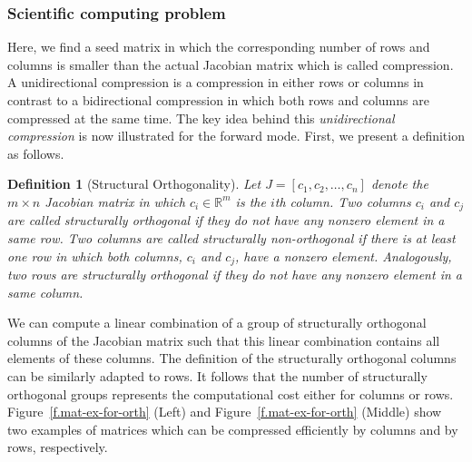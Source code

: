 \documentclass[12pt, twoside,a4paper,toc=bibliography]{scrbook}
\newtheorem{definition}{Definition}
\newcommand{\figref}[1]{Figure~\protect\ref{#1}}
\newcommand{\setR}{\ensuremath{\mathbb{R}}}
\begin{document}
\subsubsection{Scientific computing problem}
\label{ss.problem.full}
Here, we find a seed matrix in which
the corresponding number of rows and columns is smaller than the actual Jacobian matrix which is called compression.
A unidirectional compression is a compression in either rows or columns in contrast to
a bidirectional compression in which both rows and columns are compressed at the same time.
The key idea behind this \emph{unidirectional compression} is now illustrated for the
forward mode. First, we present a definition as follows.
\begin{definition}[Structural Orthogonality]
\label{d:struct_orth}
Let $J=[c_1, c_2, \dots, c_n]$ denote the $m\times n$ Jacobian matrix
in which $c_i \in \setR^m$ is the $i$th
column. Two columns $c_i$ and $c_j$ are
called \emph{structurally orthogonal} if they do not have any nonzero element in a same
row. Two columns are called \emph{structurally non-orthogonal} if there is at least one
row in which both columns, $c_i$ and $c_j$, have a nonzero element.
Analogously, two rows are
\emph{structurally orthogonal} if they do not have any nonzero element in a same column.
\end{definition}
We can compute a linear combination of a group of structurally orthogonal columns of the Jacobian matrix
such that this linear combination contains all elements of these columns.
The definition of the structurally orthogonal columns can be similarly adapted to rows.
It follows that the number of structurally orthogonal groups
represents the computational cost either for columns or rows.
\figref{f.mat-ex-for-orth} (Left) and \figref{f.mat-ex-for-orth} (Middle) show two examples
of matrices which can be compressed efficiently by columns and by rows, respectively.
\end{document}
